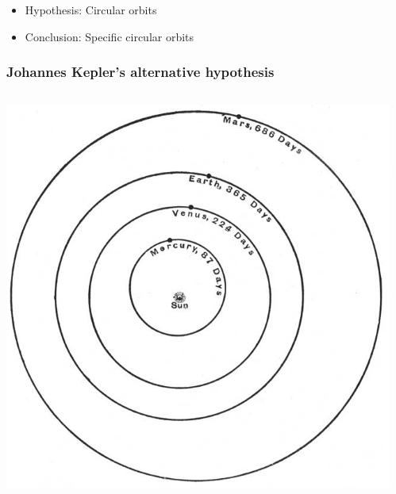 \documentclass{beamer}
\begin{document}
\begin{frame}
\begin{columns}
\begin{column}{0.5\textwidth}
    \end{column}
  \end{columns}
  \begin{itemize}
  \item Hypothesis: Circular orbits
  \item Conclusion: \alert{Specific} circular orbits
  \end{itemize}
\end{frame}

\begin{frame}
  \frametitle{Johannes Kepler's alternative hypothesis}
  \begin{columns}
    \begin{column}{0.5\textwidth}
      \includegraphics[width=\columnwidth]{figures/orbits}
    \end{column}
    \begin{column}{0.5\textwidth}

\end{column}
\end{columns}
\end{frame}
\end{document}
